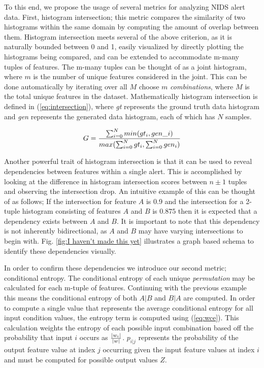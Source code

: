 To this end, we propose the usage of several metrics for analyzing NIDS alert data. First, histogram intersection; this metric compares the similarity of two histograms within the same domain by computing the amount of overlap between them. Histogram intersection meets several of the above criterion, as it is naturally bounded between 0 and 1, easily visualized by directly plotting the histograms being compared, and can be extended to accommodate m-many tuples of features. The m-many tuples can be thought of as a joint histogram, where $m$ is the number of unique features considered in the joint. This can be done automatically by iterating over all $M$ choose $m$ \emph{combinations}, where $M$ is the total unique features in the dataset. Mathematically histogram intersection is defined in (\ref{eq:intersection}), where \emph{gt} represents the ground truth data histogram and \emph{gen} represents the generated data histogram, each of which has $N$ samples.

\begin{equation}
\label{eq:intersection}
	G = {{\sum_{i=0}^{N} min(gt_i, gen\_i)} \over {max(\sum_{i=0}^{N} gt_i, \sum_{i=0}^{N} gen_i)}}
\end{equation}

Another powerful trait of histogram intersection is that it can be used to reveal dependencies between features within a single alert. This is accomplished by looking at the difference in histogram intersection scores between $n\pm1$ tuples and observing the intersection drop. An intuitive example of this can be thought of as follows; If the intersection for feature $A$ is 0.9 and the intersection for a 2-tuple histogram consisting of features $A$ and $B$ is $0.875$ then it is expected that a dependency exists between $A$ and $B$. It is important to note that this dependency is not inherently bidirectional, as $A$ and $B$ may have varying intersections to begin with. Fig. \ref{fig:I haven't made this yet} illustrates a graph based schema to identify these dependencies visually. 

In order to confirm these dependencies we introduce our second metric; conditional entropy. The conditional entropy of each unique \emph{permutation} may be calculated for each m-tuple of features. Continuing with the previous example this means the conditional entropy of both $A|B$ and $B|A$ are computed. In order to compute a single value that represents the average conditional entropy for all input condition values, the entropy term is computed using (\ref{eq:wce}). This calculation weights the entropy of each possible input combination based off the probability that input $i$ occurs as ${{|w_i|} \over {|w|}}$. ${p_{i|j}}$ represents the probability of the output feature value at index $j$ occurring given the input feature values at index $i$ and must be computed for possible output values $Z$.

